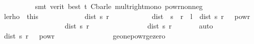 \begin{isabellebody}
\ \ \ \ \ \ \ \ \isamarkupfalse%
\ {\isacharparenleft}{\kern0pt}smt\ {\isacharparenleft}{\kern0pt}verit{\isacharcomma}{\kern0pt}\ best{\isacharparenright}{\kern0pt}\ t\ C{\isacharunderscore}{\kern0pt}bar{\isacharunderscore}{\kern0pt}le\ mult{\isacharunderscore}{\kern0pt}right{\isacharunderscore}{\kern0pt}mono\ powr{\isacharunderscore}{\kern0pt}non{\isacharunderscore}{\kern0pt}neg{\isacharparenright}{\kern0pt}\isanewline
\ \ \ \ \isacommand{{\isacharbraceright}{\kern0pt}}\isamarkupfalse%
\ \isamarkupfalse%
\ le{\isacharunderscore}{\kern0pt}rho\ {\isacharequal}{\kern0pt}\ this\isanewline
\ \ \ \ \isacommand{{\isacharbraceleft}{\kern0pt}}\isamarkupfalse%
\isanewline
\ \ \ \ \ \ \isamarkupfalse%
\ {\isachardoublequoteopen}dist\ s\ r\ {\isasymge}\ {\isasymrho}{\isachardoublequoteclose}\isanewline
\ \ \ \ \ \ \isamarkupfalse%
\ \isamarkupfalse%
\ {\isachardoublequoteopen}dist\ {\isacharparenleft}{\kern0pt}{\isasymphi}\ s{\isacharparenright}{\kern0pt}\ {\isacharparenleft}{\kern0pt}{\isasymphi}\ r{\isacharparenright}{\kern0pt}\ {\isasymle}\ l\ {\isacharasterisk}{\kern0pt}\ {\isacharparenleft}{\kern0pt}dist\ s\ r\ {\isacharslash}{\kern0pt}\ {\isasymrho}{\isacharparenright}{\kern0pt}\ powr\ {\isasymgamma}{\isachardoublequoteclose}\isanewline
\ \ \ \ \ \ \isamarkupfalse%
\ {\isacharminus}{\kern0pt}\isanewline
\ \ \ \ \ \ \ \ \isamarkupfalse%
\ {\isachardoublequoteopen}{\isacharparenleft}{\kern0pt}dist\ s\ r\ {\isacharslash}{\kern0pt}\ {\isasymrho}{\isacharparenright}{\kern0pt}\ {\isasymge}\ {}{\isachardoublequoteclose}\isanewline
\ \ \ \ \ \ \ \ \ \ \isamarkupfalse%
\ {\isacartoucheopen}dist\ s\ r\ {\isasymge}\ {\isasymrho}{\isacartoucheclose}\ {\isacartoucheopen}{\isasymrho}\ {\isachargreater}{\kern0pt}\ {}{\isacartoucheclose}\ \isamarkupfalse%
\ auto\isanewline
\ \ \ \ \ \ \ \ \isamarkupfalse%
\ \isamarkupfalse%
\ {\isachardoublequoteopen}{\isacharparenleft}{\kern0pt}dist\ s\ r\ {\isacharslash}{\kern0pt}\ {\isasymrho}{\isacharparenright}{\kern0pt}\ powr\ {\isasymgamma}\ {\isasymge}\ {}{\isachardoublequoteclose}\isanewline
\ \ \ \ \ \ \ \ \ \ \isamarkupfalse%
\ {\isachardoublequoteopen}{\isacharasterisk}{\kern0pt}{\isachardoublequoteclose}{\isacharparenleft}{\kern0pt}{}{\isacharparenright}{\kern0pt}\ ge{\isacharunderscore}{\kern0pt}one{\isacharunderscore}{\kern0pt}powr{\isacharunderscore}{\kern0pt}ge{\isacharunderscore}{\kern0pt}zero\ \isamarkupfalse%

\end{isabellebody}
